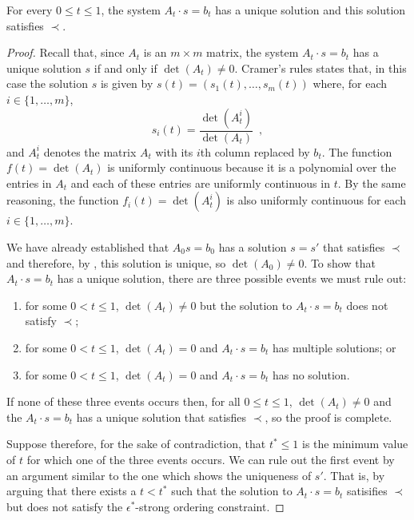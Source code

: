 \documentclass{patmorin}
\begin{document}
\begin{lem}
   For every $0\le t\le 1$, the system $A_t\cdot s=b_t$ has a unique solution
   and this solution satisfies $\prec$.
\end{lem}

\begin{proof}
   Recall that, since $A_t$ is an $m\times m$ matrix, the system $A_t\cdot
   s=b_t$ has a unique solution $s$ if and only if $\det(A_t)\neq 0$.
   Cramer's rules states that, in this case the solution $s$ is given
   by $s(t)=(s_1(t),\ldots,s_m(t))$ where, for each $i\in\{1,\ldots,m\}$,
   \[ 
       s_i(t) = \frac{\det(A_t^i)}{\det(A_t)} \enspace ,
   \]
   and $A_t^i$ denotes the matrix $A_t$ with its $i$th column replaced
   by $b_t$. The function $f(t)=\det(A_t)$ is uniformly continuous
   because it is a polynomial over the entries in $A_t$ and each of
   these entries are uniformly continuous in $t$. By the same reasoning,
   the function $f_i(t)=\det(A_t^i)$ is also uniformly continuous for
   each $i\in\{1,\ldots,m\}$.

   We have already established that $A_0s=b_0$ has a solution $s=s'$
   that satisfies $\prec$ and therefore, by , this
   solution is unique, so $\det(A_0)\neq 0$.  To show that $A_t\cdot s=b_t$
   has a unique solution, there are three possible events we must rule out:
   \begin{enumerate}
     \item for some $0<t\le 1$, $\det(A_t)\neq 0$ but
           the solution to $A_t\cdot s=b_t$ does not satisfy $\prec$;
     \item for some $0<t\le 1$, $\det(A_t)=0$ and $A_t\cdot s=b_t$ has multiple 
           solutions; or
     \item for some $0<t\le 1$, $\det(A_t)=0$ and $A_t\cdot s=b_t$ has no solution.
   \end{enumerate}
   If none of these three events occurs then, for all $0\le t\le
   1$, $\det(A_t)\neq 0$ and the $A_t\cdot s=b_t$ has a unique solution that
   satisfies $\prec$, so the proof is complete.

   Suppose therefore, for the sake of contradiction, that $t^*\le 1$
   is the minimum value of $t$ for which one of the three events occurs.
   We can rule out the first event by an argument similar to the one which
   shows the uniqueness of $s'$.  That is, by arguing that there exists
   a $t<t^*$ such that the solution to $A_{t}\cdot s=b_{t}$ satisifies $\prec$
   but does not satisfy the $\epsilon^*$-strong ordering constraint.


\end{proof}
\end{document}
